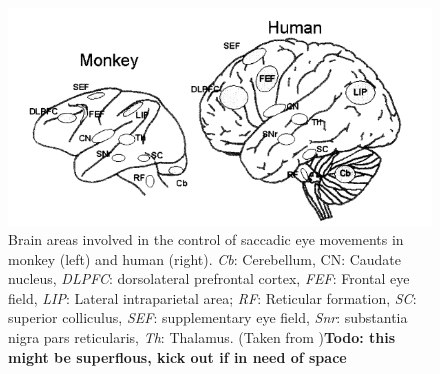 \documentclass[a4paper, 12pt]{scrreprt}
\begin{document}
\begin{figure}
	\includegraphics[scale=0.5]{img/saccregions.png}
	\caption[Regions involved in saccadic eye movements]{\small{Brain areas involved in the control of saccadic eye movements in monkey (left) and human (right). \textit{Cb}: Cerebellum, CN: Caudate nucleus, \textit{DLPFC}: dorsolateral prefrontal cortex, \textit{FEF}: Frontal eye field, \textit{LIP}: Lateral intraparietal area; \textit{RF}: Reticular formation, \textit{SC}: superior colliculus, \textit{SEF}: supplementary eye field, \textit{Snr}: substantia nigra pars reticularis, \textit{Th}: Thalamus. (Taken from \textcite{munoz2002commentary})}\textbf{Todo: this might be superflous, kick out if in need of space}}
	\label{fig:saccregions}
\end{figure}
\end{document}
